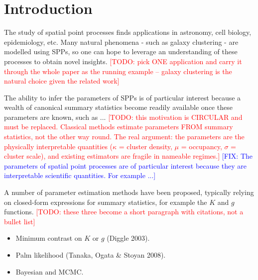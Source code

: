 \documentclass[11pt,letterpaper]{article}
\newcommand{\1}{\mathds{1}}
\newcommand{\todo}[1]{\textcolor{red}{[TODO: #1]}}
\newcommand{\fix}[1]{\textcolor{blue}{[FIX: #1]}}
\newcommand{\todo}[1]{}
\newcommand{\fix}[1]{}
\theoremstyle{plain}
\theoremstyle{definitioncolon}
\begin{document}
\section{Introduction}

The study of spatial point processes finds applications in astronomy, cell
biology, epidemiology, etc. Many natural phenomena - such as galaxy clustering -
are modelled using SPPs, so one can hope to leverage an understanding of these
processes to obtain novel insights.
\todo{pick ONE application and carry it through the whole paper as the running
example -- galaxy clustering is the natural choice given the related work}

The ability to infer the parameters of SPPs is of particular interest because a
wealth of canonical summary statistics become readily available once these
parameters are known, such as ...
\todo{this motivation is CIRCULAR and must be replaced. Classical methods
estimate parameters FROM summary statistics, not the other way round. The real
argument: the parameters are the physically interpretable quantities
($\kappa$ = cluster density, $\mu$ = occupancy, $\sigma$ = cluster scale), and
existing estimators are fragile in nameable regimes.}
\fix{The parameters of spatial point processes are of particular interest because 
they are interpretable scientific quantities. For example ...}


A number of parameter estimation methods have been proposed, typically relying
on closed-form expressions for summary statistics, for example the $K$ and $g$
functions.
\todo{these three become a short paragraph with citations, not a bullet list}
\begin{itemize}[nosep]
  \item Minimum contrast on $K$ or $g$ (Diggle 2003).
  \item Palm likelihood (Tanaka, Ogata \& Stoyan 2008).
  \item Bayesian and MCMC.
\end{itemize}
\end{document}
